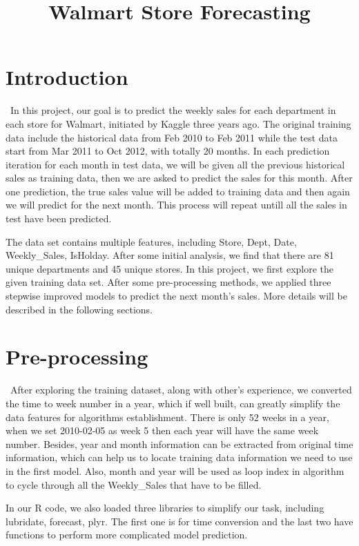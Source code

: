 \documentclass[12pt]{article}
\title{Walmart Store Forecasting}
\begin{document}
%
\maketitle

\section{Introduction}
\quad\ In this project, our goal is to predict the weekly sales for each department in each store for Walmart, initiated by Kaggle three years ago. The original training data include the historical data from Feb 2010 to Feb 2011 while the test data start from Mar 2011 to Oct 2012, with totally 20 months. In each prediction iteration for each month in test data, we will be given all the previous historical sales as training data, then we are asked to predict the sales for this month. After one prediction, the true sales value will be added to training data and then again we will predict for the next month. This process will repeat untill all the sales in test have been predicted. 

The data set contains multiple features, including Store, Dept, Date, Weekly\_Sales, IsHolday. After some initial analysis, we find that there are 81 unique departments and 45 unique stores. In this project, we first explore the given training data set. After some pre-processing methods, we applied three stepwise improved models to predict the next month's sales. More details will be described in the following sections.

\section{Pre-processing}
\quad\ After exploring the training dataset, along with other's experience, we converted the time to week number in a year, which if well built, can greatly simplify the data features for algorithms establishment. There is only 52 weeks in a year, when we set 2010-02-05 as week 5 then each year will have the same week number. Besides, year and month information can be extracted from original time information, which can help us to locate training data information we need to use in the first model. Also, month and year will be used as loop index in algorithm to cycle through all the Weekly\_Sales that have to be filled.

In our R code, we also loaded three libraries to simplify our task, including lubridate, forecast, plyr. The first one is for time conversion and the last two have functions to perform more complicated model prediction.
\end{document}

